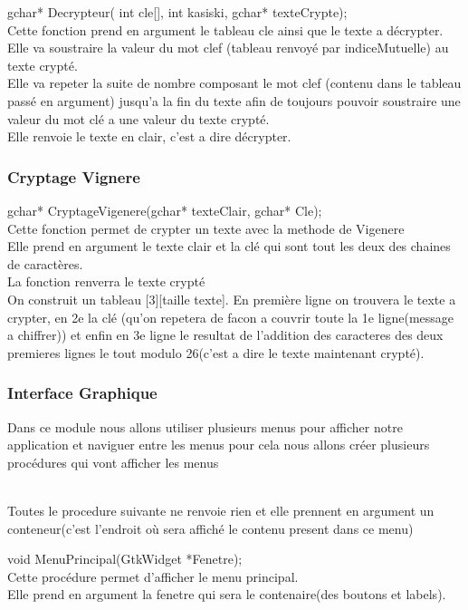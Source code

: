 \documentclass[a4]{article}
\begin{document}
	gchar* Decrypteur( int cle[], int kasiski, gchar* texteCrypte);\\
		Cette fonction prend en argument le tableau cle ainsi que le texte a décrypter.
		Elle va soustraire la valeur du mot clef (tableau renvoyé par indiceMutuelle) au texte crypté.\\
		Elle va repeter la suite de nombre composant le mot clef (contenu dans le tableau passé en argument) jusqu'a la fin du texte afin de toujours pouvoir
		soustraire une valeur du mot clé a une valeur du texte crypté.\\
		Elle renvoie le texte en clair, c'est a dire décrypter.\\
		
		\subsubsection{Cryptage Vignere}
	gchar* CryptageVigenere(gchar* texteClair, gchar* Cle);\\
		Cette fonction permet de crypter un texte avec la methode de Vigenere\\
		Elle prend en argument le texte clair et la clé qui sont tout les deux des chaines de caractères.\\
		La fonction renverra le texte crypté\\
		On construit un tableau [3][taille texte]. En première ligne on trouvera le texte a crypter, 
		en 2e la clé (qu'on repetera de facon a couvrir toute la 1e ligne(message a chiffrer)) et enfin 
		en 3e ligne le resultat de l'addition des caracteres des deux premieres lignes le tout modulo 
		26(c'est a dire le texte maintenant crypté).
		
		\subsubsection{Interface Graphique}
		Dans ce module nous allons utiliser plusieurs menus pour afficher notre application et naviguer 
		entre les menus pour cela nous allons créer plusieurs procédures qui vont afficher les menus  
		
		\\
		
		Toutes le procedure suivante ne renvoie rien et elle prennent en argument un conteneur(c'est l'endroit où sera affiché le contenu present dans ce menu)
		
	void MenuPrincipal(GtkWidget *Fenetre);\\
		Cette procédure permet d'afficher le menu principal.\\
		Elle prend en argument la fenetre qui sera le contenaire(des boutons et labels).\\
	
\end{document}

